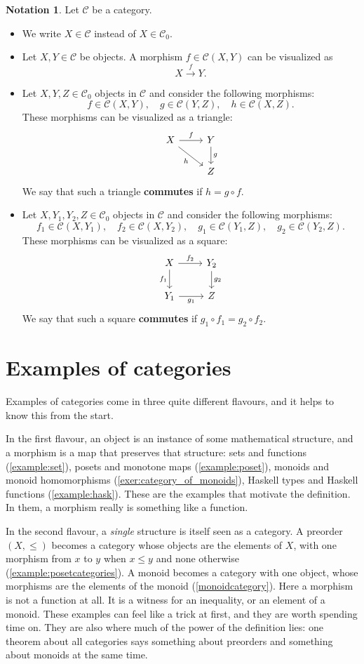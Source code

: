 \documentclass[a4paper,11pt, oneside,titlepage=false]{scrbook}
\theoremstyle{plain}
\theoremstyle{definition}
\newtheorem{nota}[thm]{Notation}
\newcommand{\Cat}[1]{\mathcal{#1}}
\newcommand{\CC}{\Cat{C}}
\newcommand{\Ob}[1]{{#1}_0}
\newcommand{\CHom}[3]{{#1}(#2,#3)}
\newcommand{\co}[2]{\ensuremath{#2 \circ #1}}
\begin{document}
\begin{nota} Let $\CC$ be a category.
\begin{itemize}
\item We write $X\in\CC$ instead of $X\in \Ob{\CC}$.
\item Let $X,Y\in \CC$ be objects. A morphism $f\in\CHom{\CC}{X}{Y}$ can be visualized as \[ X \xrightarrow{f} Y. \]
\item Let $X,Y, Z \in \Ob{\CC}$ objects in $\CC$ and consider the following morphisms:
\[
f\in\CHom{\CC}{X}{Y}, \quad g\in\CHom{\CC}{Y}{Z}, \quad h\in\CHom{\CC}{X}{Z}.
\]
These morphisms can be visualized as a triangle:
\[
\begin{tikzcd}
X \arrow[r, "f"] \arrow[dr,swap, "h"] & Y \arrow[d, "g"] \\
& Z
\end{tikzcd}
\]
We say that such a triangle \textbf{commutes} if $h = \co{f}{g}$.
\item Let $X,Y_1,Y_2, Z \in \Ob{\CC}$ objects in $\CC$ and consider the following morphisms:
\[
f_1\in\CHom{\CC}{X}{Y_1}, \quad f_2\in\CHom{\CC}{X}{Y_2}, \quad g_1\in\CHom{\CC}{Y_1}{Z}, \quad g_2\in\CHom{\CC}{Y_2}{Z}.
\]
These morphisms can be visualized as a square:
\[
\begin{tikzcd}
X \arrow[r, "f_2"] \arrow[d,swap, "f_1"] & Y_2 \arrow[d, "g_2"] \\
Y_1 \arrow[r, swap, "g_1"] & Z
\end{tikzcd}
\]
We say that such a square \textbf{commutes} if $\co{f_1}{g_1} = \co{f_2}{g_2}$.
\end{itemize}
\end{nota}

\section{Examples of categories}

Examples of categories come in three quite different flavours, and it helps to
know this from the start.

In the first flavour, an object is an instance of some mathematical structure,
and a morphism is a map that preserves that structure: sets and functions
(\cref{example:set}), posets and monotone maps (\cref{example:poset}), monoids
and monoid homomorphisms (\cref{exer:category_of_monoids}), Haskell types and
Haskell functions (\cref{example:hask}).
These are the examples that motivate the definition.
In them, a morphism really is something like a function.

In the second flavour, a \emph{single} structure is itself seen as a category.
A preorder $(X,\leq)$ becomes a category whose objects are the elements of $X$,
with one morphism from $x$ to $y$ when $x \leq y$ and none otherwise
(\cref{example:posetcategories}).
A monoid becomes a category with one object, whose morphisms are the elements
of the monoid (\cref{monoidcategory}).
Here a morphism is not a function at all.
It is a witness for an inequality, or an element of a monoid.
These examples can feel like a trick at first, and they are worth spending time
on.
They are also where much of the power of the definition lies: one theorem about
all categories says something about preorders and something about monoids at
the same time.
\end{document}
